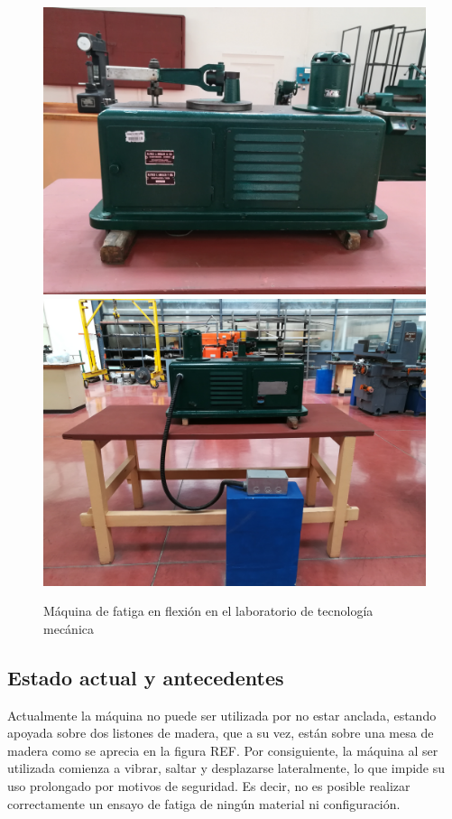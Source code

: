 \begin{figure}[h]
\centering
\includegraphics[scale=0.05]{Imagenes/maq_del.jpg}
\label{fig:maq_del}
\includegraphics[scale=0.05]{Imagenes/maqfull_post.jpg}
\label{fig:maqfull_post}
\caption{Máquina de fatiga en flexión en el laboratorio de tecnología mecánica}
\label{fig:maq_fat}
\end{figure}

\subsection{Estado actual y antecedentes}
Actualmente la máquina no puede ser utilizada por no estar anclada, estando apoyada sobre dos listones de madera, que a su vez, están sobre una mesa de madera como se aprecia en la figura REF. Por consiguiente, la máquina al ser utilizada comienza a vibrar, saltar y desplazarse lateralmente, lo que impide su uso prolongado por motivos de seguridad. Es decir, no es posible realizar correctamente un ensayo de fatiga de ningún material ni configuración.

